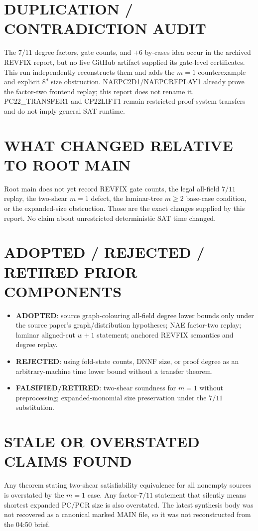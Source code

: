 \documentclass[11pt]{article}
\newcommand{\status}[1]{\textbf{#1}}
\begin{document}
\section*{DUPLICATION / CONTRADICTION AUDIT}
The $7/11$ degree factors, gate counts, and $+6$ by-cases idea occur in the archived REVFIX report, but no live GitHub artifact supplied its gate-level certificates.  This run independently reconstructs them and adds the $m=1$ counterexample and explicit $8^d$ size obstruction.  NAEPC2D1/NAEPCREPLAY1 already prove the factor-two frontend replay; this report does not rename it.  PC22\_TRANSFER1 and CP22LIFT1 remain restricted proof-system transfers and do not imply general SAT runtime.

\section*{WHAT CHANGED RELATIVE TO ROOT MAIN}
Root main does not yet record REVFIX gate counts, the legal all-field $7/11$ replay, the two-shear $m=1$ defect, the laminar-tree $m\geq2$ base-case condition, or the expanded-size obstruction.  Those are the exact changes supplied by this report.  No claim about unrestricted deterministic SAT time changed.

\section*{ADOPTED / REJECTED / RETIRED PRIOR COMPONENTS}
\begin{itemize}
\item \status{ADOPTED}: source graph-colouring all-field degree lower bounds only under the source paper's graph/distribution hypotheses; NAE factor-two replay; laminar aligned-cut $w+1$ statement; anchored REVFIX semantics and degree replay.
\item \status{REJECTED}: using fold-state counts, DNNF size, or proof degree as an arbitrary-machine time lower bound without a transfer theorem.
\item \status{FALSIFIED/RETIRED}: two-shear soundness for $m=1$ without preprocessing; expanded-monomial size preservation under the $7/11$ substitution.
\end{itemize}

\section*{STALE OR OVERSTATED CLAIMS FOUND}
Any theorem stating two-shear satisfiability equivalence for all nonempty sources is overstated by the $m=1$ case.  Any factor-$7/11$ statement that silently means shortest expanded PC/PCR size is also overstated.  The latest synthesis body was not recovered as a canonical marked MAIN file, so it was not reconstructed from the 04:50 brief.
\end{document}
